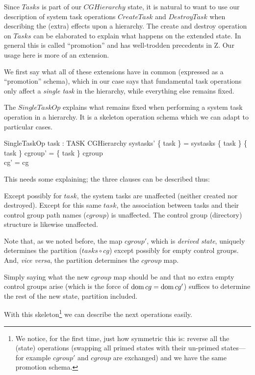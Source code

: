 \documentclass[a4paper,twoside,12pt]{article}
\begin{document}
Since $Tasks$ is part of our $CGHierarchy$ state, it is natural to want to use our description of system task operations $CreateTask$
and $DestroyTask$ when describing the (extra) effects upon a hierarchy. The create and destroy operation on
$Tasks$ can be elaborated to explain what happens on the extended state.
In general this is called ``promotion'' and has well-trodden precedents in Z. Our usage here is more of an extension.

We first say what all of these extensions have in common (expressed as a ``promotion'' schema),
which in our case says that fundamental task operations only affect a \emph{single task} in the hierarchy, while
everything else remains fixed.

The $SingleTaskOp$ explains what remains fixed when performing a system task operation in a hierarchy.
It is a skeleton operation schema which we can adapt to particular cases.

\begin{schema}{SingleTaskOp}
task : TASK
\also
\Delta CGHierarchy
\where
systasks' \setminus \{ task \} = systasks \setminus \{ task \}
\also
\{ task \} \ndres cgroup' = \{ task \} \ndres cgroup \\
\dom cg' = \dom cg
\end{schema}
This needs some explaining; the three clauses can be described thus:

Except possibly for $task$, the system tasks are unaffected (neither created nor destroyed).
Except for this same $task$, the association between tasks and their control group path names ($cgroup$) is unaffected.
The control group (directory) structure is likewise unaffected.

Note that, as we noted before, the map $cgroup'$, which is \emph{derived state},
uniquely determines the partition ($tasks \circ cg$) except possibly for
empty control groups. And, \emph{vice versa}, the partition determines the $cgroup$ map.

Simply saying what the new $cgroup$ map should be and that no extra empty control groups arise
(which is the force of $\mathop{\mathrm{dom}} cg = \mathop{\mathrm{dom}} cg'$)
suffices to determine the rest of the new state, partition included.

With this skeleton\footnote{We notice, for the first time, just how symmetric this is:
reverse all the (state) operations (swapping all primed states with their un-primed states---for
example $cgroup'$ and $cgroup$ are exchanged) and we have the same promotion schema.}
we can describe the next operations easily.
\end{document}
